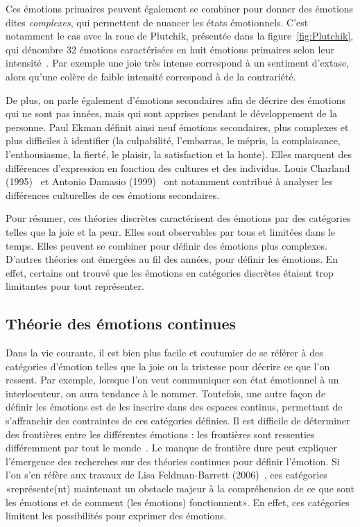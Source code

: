 

Ces émotions primaires peuvent également se combiner pour donner des émotions dites \textit{complexes}, qui permettent de nuancer les états émotionnels. C'est notamment le cas avec la roue de Plutchik, présentée dans la figure~\ref{fig:Plutchik}, qui dénombre 32 émotions caractérisées en huit émotions primaires selon leur intensité~\cite{Plutchik1980}. Par exemple une joie très intense correspond à un sentiment d'extase, alors qu'une colère de faible intensité correspond à de la contrariété.

De plus, on parle également d'émotions secondaires afin de décrire des émotions qui ne sont pas innées, mais qui sont apprises pendant le développement de la personne. Paul Ekman définit ainsi neuf émotions secondaires, plus complexes et plus difficiles à identifier (la culpabilité, l'embarras, le mépris, la complaisance, l'enthousiasme, la fierté, le plaisir, la satisfaction et la honte). Elles marquent des différences d'expression en fonction des cultures et des individus. Louis Charland (1995)~\cite{Charland1995} et Antonio Damasio (1999)~\cite{Damasio1999} ont notamment contribué à analyser les différences culturelles de ces émotions secondaires.

Pour résumer, ces théories discrètes caractérisent des émotions par des catégories telles que la joie et la peur. Elles sont observables par tous et limitées dans le temps. Elles peuvent se combiner pour définir des émotions plus complexes.
D'autres théories ont émergées au fil des années, pour définir les émotions. En effet, certains ont trouvé que les émotions en catégories discrètes étaient trop limitantes pour tout représenter. %


\subsection{Théorie des émotions continues}
Dans la vie courante, il est bien plus facile et coutumier de se référer à des catégories d'émotion telles que la joie ou la tristesse pour décrire ce que l'on ressent. Par exemple, lorsque l'on veut communiquer son état émotionnel à un interlocuteur, on aura tendance à le nommer. Toutefois, une autre façon de définir les émotions est de les inscrire dans des espaces continus, permettant de s'affranchir des contraintes de ces catégories définies. Il est difficile de déterminer des frontières entre les différentes émotions : les frontières sont ressenties différemment par tout le monde~\cite{Busso2012}. Le manque de frontière dure peut expliquer l'émergence des recherches sur des théories continues pour définir l'émotion. Si l'on s'en réfère aux travaux de Lisa Feldman-Barrett (2006)~\cite{Feldman2006}, ces catégories «représente(nt) maintenant un obstacle majeur à la compréhension de ce que sont les émotions et de comment (les émotions) fonctionnent». En effet, ces catégories limitent les possibilités pour exprimer des émotions.

